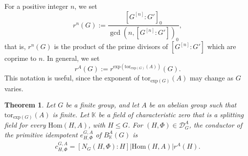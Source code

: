 \documentclass[letterpaper,12pt]{article}
\theoremstyle{plain}
\newtheorem{theorem}{Theorem}[section]
\theoremstyle{definition}
\newcommand{\K}{\mathbb{K}}
\begin{document}
For a positive integer $n$, we set
$$r^n(G):=\frac{\left[G^{[n]}:G'\right]_0}{\gcd\left(n,\left[G^{[n]}:G'\right]\right)_0},$$
that is, $r^n(G)$ is the product of the prime divisors of $\left[G^{[n]}:G'\right]$ which are coprime to $n$. In general, we set 
$$r^A(G):=r^{\mathrm{exp}\left(\mathrm{tor}_{\mathrm{exp}(G)}(A)\right)}(G).$$
This notation is useful, since the exponent of $\mathrm{tor}_{\mathrm{exp}(G)}(A)$ may change as $G$ varies.

\begin{theorem}
    Let $G$ be a finite group, and let $A$ be an abelian group such that
    $\mathrm{tor}_{\mathrm{exp}(G)}(A)$ is finite. Let $\K$ be a field of characteristic zero that is a splitting field for every $\mathrm{Hom}(H,A)$, with $H\leq G$. For $(H,\Phi)\in\mathcal{D}^A_G$, the conductor of the primitive idempotent $e^{G,A}_{H,\Phi}$ of $B^A_{\K}(G)$ is
    \begin{align}
        c^{G,A}_{H,\Phi}=\left[N_G(H,\Phi):H\right]\left|\mathrm{Hom}(H,A)\right|r^A(H).
    \end{align}
\end{theorem}
\end{document}

